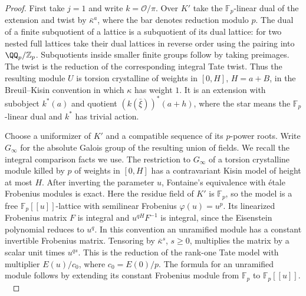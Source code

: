 \documentclass[a4paper,11pt]{article}
\theoremstyle{definition}
\theoremstyle{remark}
\newcommand{\ZZ}{\mathbb Z}\newcommand{\ord}{\operatorname{ord}}
\numberwithin{equation}{section}
\begin{document}
\begin{proof}
First take \(j=1\) and write \(k=\mathcal O/\pi\). Over \(K'\)
take the \(\mathbb F_p\)-linear dual of the extension and twist by
\(\bar\kappa^a\), where the bar denotes reduction modulo \(p\).
The dual of a finite subquotient of a lattice is a subquotient of
its dual lattice: for two nested full lattices take their dual
lattices in reverse order using the pairing into
\(\QQ_p/\ZZ_p\). Subquotients inside smaller finite groups follow
by taking preimages. The twist is the reduction of the corresponding
integral Tate twist. Thus the resulting module \(U\) is torsion
crystalline of weights in \([0,H]\), \(H=a+B\), in the
Breuil--Kisin convention in which \(\kappa\) has weight \(1\).
It is an extension with subobject \(k^*(a)\) and quotient
\((k(\bar\xi))^*(a+h)\), where the star means the
\(\mathbb F_p\)-linear dual and \(k^*\) has trivial action.

Choose a uniformizer of \(K'\) and a compatible sequence of its
\(p\)-power roots. Write \(G_\infty\) for the absolute Galois group
of the resulting union of fields. We recall the integral comparison
facts we use. The restriction to \(G_\infty\) of a torsion crystalline
module killed by \(p\) of weights in \([0,H]\) has a contravariant
Kisin model of height at most \(H\). After inverting the parameter
\(u\), Fontaine's equivalence with \'etale Frobenius modules is
exact. Here the residue field of \(K'\) is \(\mathbb F_p\), so the
model is a free \(\mathbb F_p[[u]]\)-lattice with semilinear
Frobenius \(\varphi(u)=u^p\). Its linearized Frobenius matrix
\(F\) is integral and \(u^{qH}F^{-1}\) is integral, since the
Eisenstein polynomial reduces to \(u^q\). In this convention an
unramified module has a constant invertible Frobenius matrix.
Tensoring by \(\bar\kappa^s\), \(s\ge0\), multiplies the matrix by
a scalar unit times \(u^{qs}\). This is the reduction of the
rank-one Tate model with multiplier \(E(u)/c_0\), where
\(c_0=E(0)/p\). The formula for an unramified module follows by
extending its constant Frobenius module from \(\mathbb F_p\) to
\(\mathbb F_p[[u]]\).
~\cite[\S\S2.1, 2.4, 3.3]{III-II-cltame743}\cite[\S2]{III-II-ozekitame743}


\end{proof}
\end{document}
